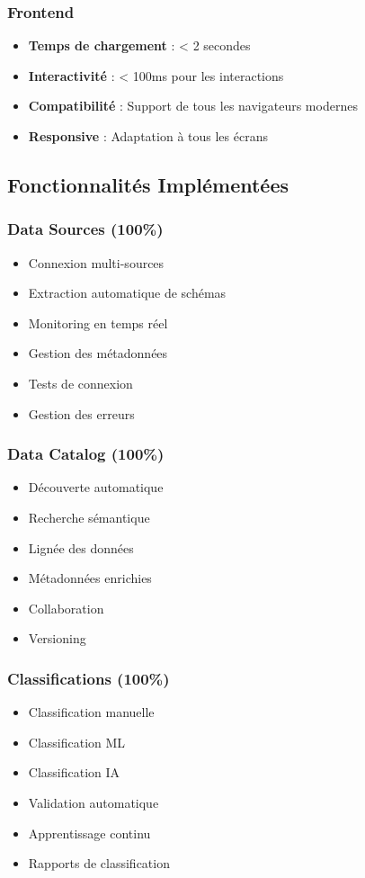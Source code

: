 \documentclass[12pt,a4paper]{article}
\begin{document}
\subsubsection{Frontend}
\begin{itemize}
    \item \textbf{Temps de chargement} : < 2 secondes
    \item \textbf{Interactivité} : < 100ms pour les interactions
    \item \textbf{Compatibilité} : Support de tous les navigateurs modernes
    \item \textbf{Responsive} : Adaptation à tous les écrans
\end{itemize}

\subsection{Fonctionnalités Implémentées}

\subsubsection{Data Sources (100\%)}
\begin{itemize}
    \item Connexion multi-sources
    \item Extraction automatique de schémas
    \item Monitoring en temps réel
    \item Gestion des métadonnées
    \item Tests de connexion
    \item Gestion des erreurs
\end{itemize}

\subsubsection{Data Catalog (100\%)}
\begin{itemize}
    \item Découverte automatique
    \item Recherche sémantique
    \item Lignée des données
    \item Métadonnées enrichies
    \item Collaboration
    \item Versioning
\end{itemize}

\subsubsection{Classifications (100\%)}
\begin{itemize}
    \item Classification manuelle
    \item Classification ML
    \item Classification IA
    \item Validation automatique
    \item Apprentissage continu
    \item Rapports de classification
\end{itemize}
\end{document}
